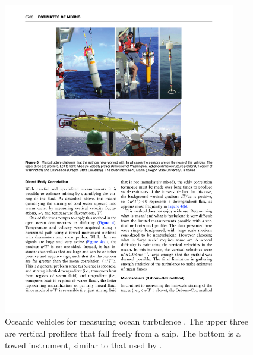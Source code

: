 \documentclass[11pt]{article}
\begin{document}
\begin{figure}[hbtp]
  \begin{center}
    \includegraphics[width=4in]{images/KlymakNash09Fig3}
    \caption{Oceanic vehicles for measuring ocean turbulence
\citep{klymaknash09}. The upper three are vertical profilers that fall freely
from a ship.  The bottom is a towed instrument, similar to that used by
\citet{grantetal62, gargettetal84}.}   
    \label{fig:KlymakNash09Fig3}
  \end{center}
\end{figure}
\end{document}

